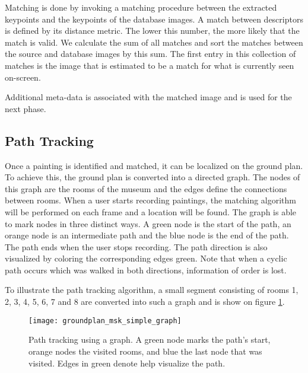 	Matching is done by invoking a matching procedure between the extracted keypoints and the keypoints of the database images. A match between descriptors is defined by its distance metric. The lower this number, the more likely that the match is valid. We calculate the sum of all matches and sort the matches between the source and database images by this sum. The first entry in this collection of matches is the image that is estimated to be a match for what is currently seen on-screen. 

	Additional meta-data is associated with the matched image and is used for the next phase.

	\subsection{Path Tracking}
	Once a painting is identified and matched, it can be localized on the ground plan. To achieve this, the ground plan is converted into a directed graph. The nodes of this graph are the rooms of the museum and the edges define the connections between rooms. When a user starts recording paintings, the matching algorithm will be performed on each frame and a location will be found. The graph is able to mark nodes in three distinct ways. A green node is the start of the path, an orange node is an intermediate path and the blue node is the end of the path. The path ends when the user stops recording. The path direction is also visualized by coloring the corresponding edges green. Note that when a cyclic path occurs which was walked in both directions, information of order is lost.


	To illustrate the path tracking algorithm,  a small segment consisting of rooms 1, 2, 3, 4, 5, 6, 7 and 8 are converted into such a graph and is show on figure \ref{fig:groundplan_msk_simple_graph}.



	\begin{figure}
		\texttt{[image: groundplan\_msk\_simple\_graph]}
		\caption{Path tracking using a graph. A green node marks the path's start, orange nodes the visited rooms, and blue the last node that was visited. Edges in green denote help visualize the path.}
		\label{fig:groundplan_msk_simple_graph}
	\end{figure}

